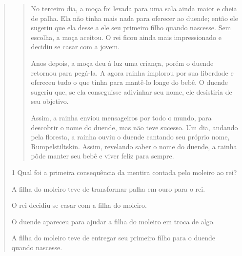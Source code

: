 \begin{quote}
\begin{quote}
No terceiro dia, a moça foi levada para uma sala ainda maior e cheia de
palha. Ela não tinha mais nada para oferecer ao duende; então ele
sugeriu que ela desse a ele seu primeiro filho quando nascesse. Sem
escolha, a moça aceitou. O rei ficou ainda mais impressionado e decidiu
se casar com a jovem.

Anos depois, a moça deu à luz uma criança, porém o duende retornou para
pegá-la. A agora rainha implorou por sua liberdade e ofereceu tudo o que
tinha para mantê-lo longe do bebê. O duende sugeriu que, se ela
conseguisse adivinhar seu nome, ele desistiria de seu objetivo.

Assim, a rainha enviou mensageiros por todo o mundo, para descobrir o
nome do duende, mas não teve sucesso. Um dia, andando pela floresta, a
rainha ouviu o duende cantando seu próprio nome, Rumpelstiltskin. Assim,
revelando saber o nome do duende, a rainha pôde manter seu bebê e viver
feliz para sempre.

\end{quote}

\num{1} Qual foi a primeira consequência da mentira contada pelo moleiro ao rei?

\begin{escolha}
\item A filha do moleiro teve de transformar palha em ouro para o rei.

\item O rei decidiu se casar com a filha do moleiro.

\item O duende apareceu para ajudar a filha do moleiro em troca de algo.

\item A filha do moleiro teve de entregar seu primeiro filho para o duende quando nascesse.
\end{escolha}



\end{quote}
